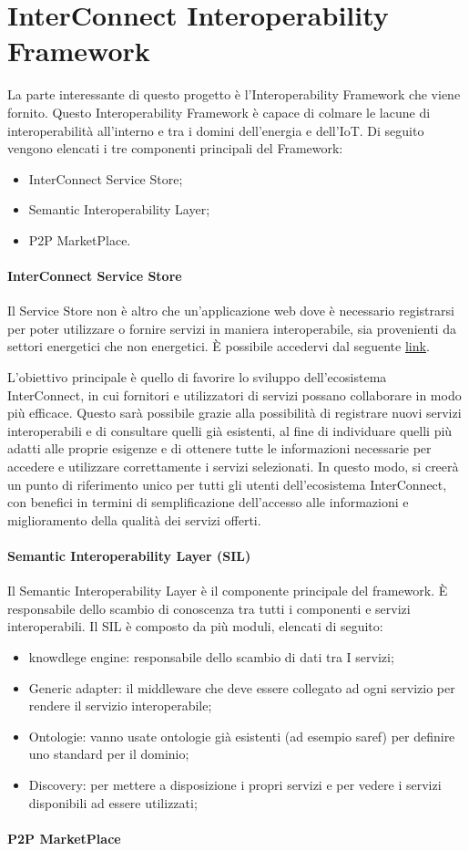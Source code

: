 \section{InterConnect Interoperability Framework}
La parte interessante di questo progetto è l'Interoperability Framework che viene fornito.
Questo Interoperability Framework è capace di colmare le lacune di interoperabilità all'interno e tra i domini dell'energia e dell'IoT.
Di seguito vengono elencati i tre componenti principali del Framework:
\begin{itemize}
    \item InterConnect Service Store;
    \item Semantic Interoperability Layer;
    \item P2P MarketPlace.
\end{itemize}

\paragraph{InterConnect Service Store}

Il Service Store non è altro che un'applicazione web dove è necessario registrarsi per poter utilizzare o fornire servizi in maniera interoperabile, sia provenienti da settori energetici che non energetici. È possibile accedervi dal seguente \href{https://store.interconnectproject.eu/ServiceStore}{link}.

L'obiettivo principale è quello di favorire lo sviluppo dell'ecosistema InterConnect, in cui fornitori e utilizzatori di servizi possano collaborare in modo più efficace. Questo sarà possibile grazie alla possibilità di registrare nuovi servizi interoperabili e di consultare quelli già esistenti, al fine di individuare quelli più adatti alle proprie esigenze e di ottenere tutte le informazioni necessarie per accedere e utilizzare correttamente i servizi selezionati. In questo modo, si creerà un punto di riferimento unico per tutti gli utenti dell'ecosistema InterConnect, con benefici in termini di semplificazione dell'accesso alle informazioni e miglioramento della qualità dei servizi offerti.


\paragraph{Semantic Interoperability Layer (SIL)}
Il Semantic Interoperability Layer è il componente principale del framework. È responsabile dello scambio di conoscenza tra tutti i componenti e servizi interoperabili. 
Il SIL è composto da più moduli, elencati di seguito:
\begin{itemize}
    \item knowdlege engine: responsabile dello scambio di dati tra I servizi;
\item Generic adapter: il middleware che deve essere collegato ad ogni servizio per rendere il servizio interoperabile;
\item Ontologie: vanno usate ontologie già esistenti (ad esempio saref) per definire uno standard per il dominio;
\item Discovery: per mettere a disposizione i propri servizi e per vedere i servizi disponibili ad essere utilizzati;
\end{itemize}


\paragraph{P2P MarketPlace}
